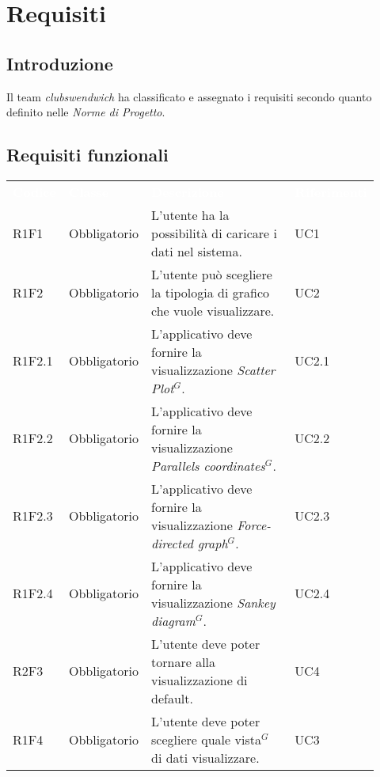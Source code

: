 \section{Requisiti}
\subsection{Introduzione}
Il team \textit{clubswendwich} ha classificato e assegnato i requisiti secondo quanto definito nelle \textit{Norme di Progetto}. 
\subsection{Requisiti funzionali}
{\renewcommand{\arraystretch}{1.5}
\begin{longtable}{p{0.12\linewidth}p{0.15\linewidth}p{0.50\linewidth}p{0.15\linewidth}}
	\rowcolor[RGB]{33, 73, 50}
	\textcolor{white}{\textbf{Codice}} & \textcolor{white}{\textbf{Classe}} & \textcolor{white}{\textbf{Descrizione}} &
    \textcolor{white}{\textbf{Riferimenti}}\\
    \rowcolor[RGB]{216, 235, 171}
    R1F1 & Obbligatorio & L'utente ha la possibilità di caricare i dati nel sistema. & UC1\\
    
    \rowcolor[RGB]{233, 245, 206}
    R1F2 & Obbligatorio & L'utente può scegliere la tipologia di grafico che vuole visualizzare. & UC2\\
    \rowcolor[RGB]{216, 235, 171}
    R1F2.1 & Obbligatorio & L'applicativo deve fornire la visualizzazione \textit{Scatter Plot$^{G}$}. & UC2.1\\
    \rowcolor[RGB]{233, 245, 206}
    R1F2.2 & Obbligatorio & L'applicativo deve fornire la visualizzazione \textit{Parallels coordinates$^{G}$}. & UC2.2\\
    \rowcolor[RGB]{216, 235, 171}
    R1F2.3 & Obbligatorio & L'applicativo deve fornire la visualizzazione \textit{Force-directed graph$^{G}$}. & UC2.3\\
    \rowcolor[RGB]{233, 245, 206}
    R1F2.4 & Obbligatorio & L'applicativo deve fornire la visualizzazione \textit{Sankey diagram$^{G}$}. & UC2.4\\
    
    \rowcolor[RGB]{216, 235, 171}
    R2F3 & Obbligatorio & L'utente deve poter tornare alla visualizzazione di default. & UC4\\
    
    \rowcolor[RGB]{233, 245, 206}
    R1F4 & Obbligatorio & L'utente deve poter scegliere quale vista$^{G}$ di dati visualizzare. & UC3\\
    

\end{longtable}}
